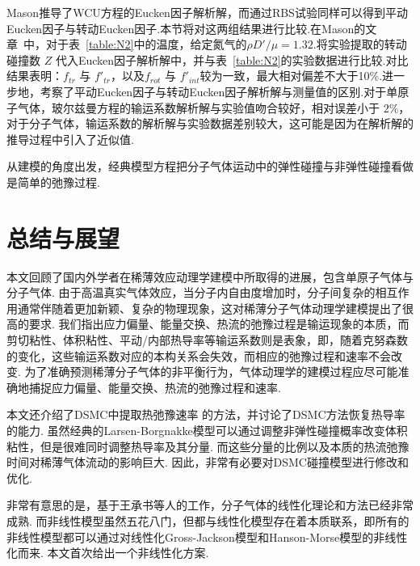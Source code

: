 Mason推导了WCU方程的Eucken因子解析解，而通过RBS试验同样可以得到平动Eucken因子与转动Eucken因子.本节将对这两组结果进行比较.在Mason的文章~\cite{mason1962heat}中，对于表~\ref{table:N2}中的温度，给定氮气的${\rho{D'}}/{\mu}=1.32$.将实验提取的转动碰撞数  $Z$ 代入Eucken因子解析解中，并与表~\ref{table:N2}的实验数据进行比较.对比结果表明：$f_{tr}$ 与 $f'_{tr}$，以及$f_{rot}$ 与 $f'_{int}$较为一致，最大相对偏差不大于10\%.进一步地，考察了平动Eucken因子与转动Eucken因子解析解与测量值的区别.对于单原子气体，玻尔兹曼方程的输运系数解析解与实验值吻合较好，相对误差小于 $  2\% $，对于分子气体，输运系数的解析解与实验数据差别较大，这可能是因为在解析解的推导过程中引入了近似值.

 从建模的角度出发，经典模型方程把分子气体运动中的弹性碰撞与非弹性碰撞看做是简单的弛豫过程. 

\section{总结与展望}

本文回顾了国内外学者在稀薄效应动理学建模中所取得的进展，包含单原子气体与分子气体. 由于高温真实气体效应，当分子内自由度增加时，分子间复杂的相互作用通常伴随着更加新颖、复杂的物理现象，这对稀薄分子气体动理学建模提出了很高的要求. 我们指出应力偏量、能量交换、热流的弛豫过程是输运现象的本质，而剪切粘性、体积粘性、平动/内部热导率等输运系数则是表象，即，随着克努森数的变化，这些输运系数对应的本构关系会失效，而相应的弛豫过程和速率不会改变. 为了准确预测稀薄分子气体的非平衡行为，气体动理学的建模过程应尽可能准确地捕捉应力偏量、能量交换、热流的弛豫过程和速率. 


本文还介绍了DSMC中提取热弛豫速率 的方法，并讨论了DSMC方法恢复热导率的能力. 虽然经典的Larsen-Borgnakke模型可以通过调整非弹性碰撞概率改变体积粘性，但是很难同时调整热导率及其分量. 而这些分量的比例以及本质的热流弛豫时间对稀薄气体流动的影响巨大. 因此，非常有必要对DSMC碰撞模型进行修改和优化.

非常有意思的是，基于王承书等人的工作，分子气体的线性化理论和方法已经非常成熟. 而非线性模型虽然五花八门，但都与线性化模型存在着本质联系，即所有的非线性模型都可以通过对线性化Gross-Jackson模型和Hanson-Morse模型的非线性化而来. 本文首次给出一个非线性化方案.  
%

